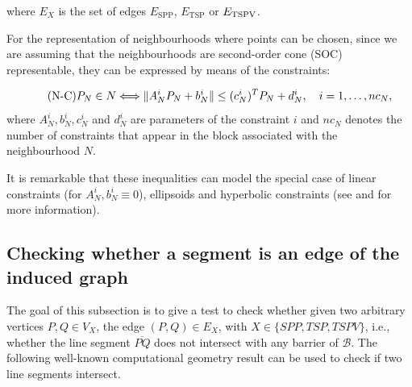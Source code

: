 \documentclass[a4paper,  review, authoryear, 1p.]{elsarticle}
\newcommand{\ESPP}{{E_{\text{SPP}}}}
\newcommand{\ETSP}{{E_{\text{TSP}}}}
\begin{document}
		where $E_X$ is the set of edges $\ESPP$, $\ETSP$ or $E_{\rm{TSPV}}$.
		
		For the representation of neighbourhoods where points can be chosen, since we are assuming that the neighbourhoods are second-order cone (SOC) representable, they can be expressed by means of the constraints:
		
		\begin{equation*}\tag{N-C}\label{eq:nC}
			P_N\in N \Longleftrightarrow
			\|A_N^i P_N + b_N^i\| \leq (c_N^i)^T P_N + d_N^i,\quad i=1,\ldots,nc_N, \\
		\end{equation*}
		where $A_N^i, b_N^i, c_N^i$ and $d_N^i$ are parameters of the constraint $i$ and $nc_N$ denotes the number of constraints that appear in the block associated with the neighbourhood $N$.
		
		It is remarkable that these inequalities can model the special case of linear constraints (for $A_N^{i}, b_N^i\equiv 0$), ellipsoids and hyperbolic constraints (see \citet{lobo_applications_1998} and \citet{boyd_convex_2004} for more information).
		
		
		\subsection{Checking whether a segment is an edge of the induced graph}
		
		The goal of this subsection is to give a test to check whether given two arbitrary vertices $P, Q\in V_X$, the edge $(P, Q)\in E_X$, with $X\in\{SPP, TSP, TSPV\}$, i.e., whether the line segment $\overline{PQ}$ does not intersect with any barrier of $\mathcal B$. The following well-known computational geometry result can be used to check if two line segments intersect.
		
\end{document}
